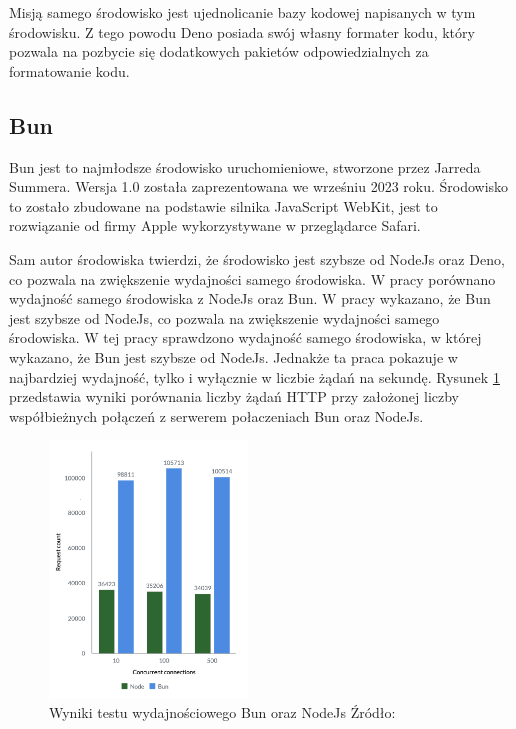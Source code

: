 Misją samego środowisko jest ujednolicanie bazy kodowej napisanych w tym środowisku. Z tego powodu Deno posiada swój własny formater kodu, który pozwala na pozbycie się dodatkowych pakietów odpowiedzialnych za formatowanie kodu. 

\subsection{Bun}
Bun \cite{bun} jest to najmłodsze środowisko uruchomieniowe, stworzone przez Jarreda Summera. Wersja 1.0 została zaprezentowana we wrześniu 2023 roku. Środowisko to zostało zbudowane na podstawie silnika JavaScript WebKit, jest to rozwiązanie od firmy Apple wykorzystywane w przeglądarce Safari.

Sam autor środowiska twierdzi, że środowisko jest szybsze od NodeJs oraz Deno, co pozwala na zwiększenie wydajności samego środowiska. W pracy \cite{NodeAndBun} porównano wydajność samego środowiska z NodeJs oraz Bun. W pracy wykazano, że Bun jest szybsze od NodeJs, co pozwala na zwiększenie wydajności samego środowiska. W tej pracy sprawdzono wydajność samego środowiska, w której wykazano, że Bun jest szybsze od NodeJs. Jednakże ta praca pokazuje w najbardziej wydajność, tylko i wyłącznie w liczbie żądań na sekundę. Rysunek \ref{fig:bun_vs_node} przedstawia wyniki porównania liczby żądań HTTP przy założonej liczby współbieżnych połączeń z serwerem połaczeniach Bun oraz NodeJs.

\begin{figure}[H]
  \centering
  \includegraphics[width=0.47\textwidth]{Figures/bun_bench_node.png}
  \caption{Wyniki testu wydajnościowego Bun oraz NodeJs Źródło:\cite{bun_test}}
  \label{fig:bun_vs_node}
\end{figure}

